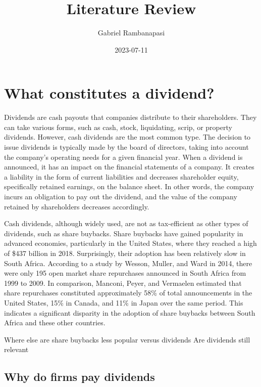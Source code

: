 \documentclass[
]{article}
\title{Literature Review}
\author{Gabriel Rambanapasi}
\date{2023-07-11}
\begin{document}
\maketitle

\hypertarget{what-constitutes-a-dividend}{%
\section{What constitutes a
dividend?}\label{what-constitutes-a-dividend}}

Dividends are cash payouts that companies distribute to their
shareholders. They can take various forms, such as cash, stock,
liquidating, scrip, or property dividends. However, cash dividends are
the most common type. The decision to issue dividends is typically made
by the board of directors, taking into account the company's operating
needs for a given financial year. When a dividend is announced, it has
an impact on the financial statements of a company. It creates a
liability in the form of current liabilities and decreases shareholder
equity, specifically retained earnings, on the balance sheet. In other
words, the company incurs an obligation to pay out the dividend, and the
value of the company retained by shareholders decreases accordingly.

Cash dividends, although widely used, are not as tax-efficient as other
types of dividends, such as share buybacks. Share buybacks have gained
popularity in advanced economies, particularly in the United States,
where they reached a high of \$437 billion in 2018. Surprisingly, their
adoption has been relatively slow in South Africa. According to a study
by Wesson, Muller, and Ward in 2014, there were only 195 open market
share repurchases announced in South Africa from 1999 to 2009. In
comparison, Manconi, Peyer, and Vermaelen estimated that share
repurchases constituted approximately 58\% of total announcements in the
United States, 15\% in Canada, and 11\% in Japan over the same period.
This indicates a significant disparity in the adoption of share buybacks
between South Africa and these other countries.

Where else are share buybacks less popular versus dividends Are
dividends still relevant

\hypertarget{why-do-firms-pay-dividends}{%
\subsection{Why do firms pay
dividends}\label{why-do-firms-pay-dividends}}
\end{document}
